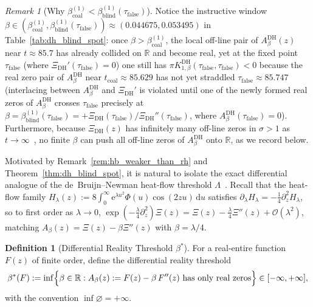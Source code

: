 \documentclass[11pt,reqno]{amsart}
\theoremstyle{definition}
\newtheorem{definition}[theorem]{Definition}
\theoremstyle{remark}
\newtheorem{remark}[theorem]{Remark}
\numberwithin{equation}{section}
\newcommand{\R}{\mathbb{R}}
\newcommand{\dd}{\mathrm{d}}
\newcommand{\ee}{\mathrm{e}}
\begin{document}
\begin{remark}[Why $\beta_{\mathrm{coal}}^{(1)} < \beta_{\mathrm{blind}}^{(1)}(\tau_{\mathrm{false}})$]\label{rem:window_coal_blind}
Notice the instructive window $\beta \in (\beta_{\mathrm{coal}}^{(1)}, \beta_{\mathrm{blind}}^{(1)}(\tau_{\mathrm{false}})) \approx (0.044675, 0.053495)$ in Table~\ref{tab:dh_blind_spot}: once $\beta > \beta_{\mathrm{coal}}^{(1)}$, the local off-line pair of $A_\beta^{\mathrm{DH}}(z)$ near $t \approx 85.7$ has already collided on $\R$ and become real, yet at the fixed point $\tau_{\mathrm{false}}$ (where $\Xi_{\mathrm{DH}}'(\tau_{\mathrm{false}}) = 0$) one still has $\pi K_{1,\beta}^{\mathrm{DH}}(\tau_{\mathrm{false}}, \tau_{\mathrm{false}}) < 0$ because the real zero pair of $A_\beta^{\mathrm{DH}}$ near $t_{\mathrm{coal}} \approx 85.629$ has not yet straddled $\tau_{\mathrm{false}} \approx 85.747$ (interlacing between $A_\beta^{\mathrm{DH}}$ and $\Xi_{\mathrm{DH}}'$ is violated until one of the newly formed real zeros of $A_\beta^{\mathrm{DH}}$ crosses $\tau_{\mathrm{false}}$ precisely at $\beta = \beta_{\mathrm{blind}}^{(1)}(\tau_{\mathrm{false}}) = +\Xi_{\mathrm{DH}}(\tau_{\mathrm{false}})/\Xi_{\mathrm{DH}}''(\tau_{\mathrm{false}})$, where $A_\beta^{\mathrm{DH}}(\tau_{\mathrm{false}}) = 0$). Furthermore, because $\Xi_{\mathrm{DH}}(z)$ has infinitely many off-line zeros in $\sigma > 1$ as $t \to \infty$~\cite{davenportheilbronn1936}, no finite $\beta$ can push all off-line zeros of $A_\beta^{\mathrm{DH}}$ onto $\R$, as we record below.
\end{remark}

Motivated by Remark~\ref{rem:hb_weaker_than_rh} and Theorem~\ref{thm:dh_blind_spot}, it is natural to isolate the exact differential analogue of the de~Bruijn--Newman heat-flow threshold $\Lambda$~\cite{debruijn1950,newman1976,csordassmithvarga1994,rodgerstao2020}. Recall that the heat-flow family $H_\lambda(z) := 8\int_0^\infty \ee^{\lambda u^2}\Phi(u)\cos(2zu)\,\dd u$ satisfies $\partial_\lambda H_\lambda = -\frac{1}{4}\partial_z^2 H_\lambda$, so to first order as $\lambda \to 0$, $\exp(-\frac{\lambda}{4}\partial_z^2)\Xi(z) = \Xi(z) - \frac{\lambda}{4}\Xi''(z) + \mathcal{O}(\lambda^2)$, matching $A_\beta(z) = \Xi(z) - \beta\Xi''(z)$ with $\beta = \lambda/4$.

\begin{definition}[Differential Reality Threshold $\beta^*$]\label{def:beta_star}
For a real-entire function $F(z)$ of finite order, define the differential reality threshold
\begin{equation}\label{eq:beta_star_def}
\beta^*(F) := \inf\Bigl\{\beta \in \R : A_\beta(z) := F(z) - \beta\,F''(z) \text{ has only real zeros}\Bigr\} \in [-\infty, +\infty],
\end{equation}
with the convention $\inf\varnothing = +\infty$.
\end{definition}
\end{document}
